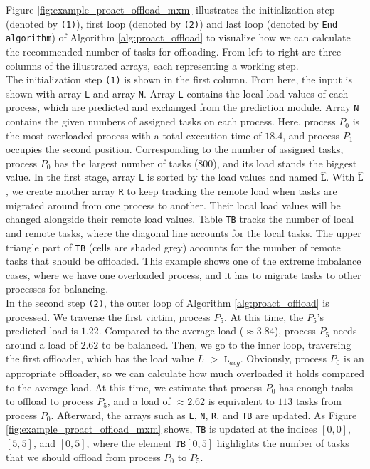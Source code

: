 Figure \ref{fig:example_proact_offload_mxm} illustrates the initialization step (denoted by \texttt{(1)}), first loop (denoted by \texttt{(2)}) and last loop (denoted by \texttt{End algorithm}) of Algorithm \ref{alg:proact_offload} to visualize how we can calculate the recommended number of tasks for offloading. From left to right are three columns of the illustrated arrays, each representing a working step.\\

The initialization step \texttt{(1)} is shown in the first column. From here, the input is shown with array \texttt{L} and array \texttt{N}. Array \texttt{L} contains the local load values of each process, which are predicted and exchanged from the prediction module. Array \texttt{N} contains the given numbers of assigned tasks on each process. Here, process $P_{0}$ is the most overloaded process with a total execution time of $18.4$, and process $P_{1}$ occupies the second position. Corresponding to the number of assigned tasks, process $P_{0}$ has the largest number of tasks ($800$), and its load stands the biggest value. In the first stage, array \texttt{L} is sorted by the load values and named $\hat{\texttt{L}}$. With $\hat{\texttt{L}}$, we create another array \texttt{R} to keep tracking the remote load when tasks are migrated around from one process to another. Their local load values will be changed alongside their remote load values. Table \texttt{TB} tracks the number of local and remote tasks, where the diagonal line accounts for the local tasks. The upper triangle part of \texttt{TB} (cells are shaded grey) accounts for the number of remote tasks that should be offloaded. This example shows one of the extreme imbalance cases, where we have one overloaded process, and it has to migrate tasks to other processes for balancing.\\

In the second step \texttt{(2)}, the outer loop of Algorithm \ref{alg:proact_offload} is processed. We traverse the first victim, process $P_{5}$. At this time, the $P_{5}$'s predicted load is $1.22$. Compared to the average load ($\approx 3.84$), process $P_{5}$ needs around a load of $2.62$ to be balanced. Then, we go to the inner loop, traversing the first offloader, which has the load value $L$ $>$ $\texttt{L}_{avg}$. Obviously, process $P_{0}$ is an appropriate offloader, so we can calculate how much overloaded it holds compared to the average load. At this time, we estimate that process $P_{0}$ has enough tasks to offload to process $P_{5}$, and a load of $\approx 2.62$ is equivalent to $113$ tasks from process $P_{0}$. Afterward, the arrays such as \texttt{L}, \texttt{N}, \texttt{R}, and \texttt{TB} are updated. As Figure \ref{fig:example_proact_offload_mxm} shows, \texttt{TB} is updated at the indices $[0,0]$, $[5,5]$, and $[0,5]$, where the element $\texttt{TB}[0,5]$ highlights the number of tasks that we should offload from process $P_{0}$ to $P_{5}$.\\

